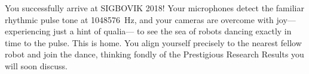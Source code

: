 You successfully arrive at SIGBOVIK 2018!
Your microphones detect the familiar rhythmic pulse tone at 1048576~Hz,
and your cameras are overcome with joy---experiencing just a hint of qualia---%
to see the sea of robots dancing exactly in time to the pulse.
This is home.
You align yourself precisely to the nearest fellow robot and join the dance,
thinking fondly of the Prestigious Research Results you will soon discuss.

\success

\renewcommand{\refname}{\textsf{The Organizing Committee Thanks}}




